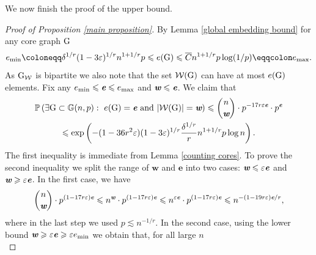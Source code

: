 \documentclass[a4paper,11pt,english,reqno]{amsart}
\numberwithin{equation}{section}
\renewcommand{\leq}{\leqslant}
\renewcommand{\geq}{\geqslant}
\newcommand{\cbar}{\overline{C}}
\newcommand{\W}{\mathcal{W}}
\renewcommand{\P}{\mathbb{P}}
\newcommand{\G}{\mathbb{G}}
\newcommand{\tu}[1]{\textup{#1}}
\def\mathbi#1{\textbf{\em #1}}
\begin{document}
		
		
		
		
		We now finish the proof of the upper bound.
		\begin{proof}[Proof of Proposition \ref{main proposition}]
			By Lemma \ref{global embedding bound} for any core graph $\tu{G}$ %
			\begin{equation*}
				e_{\min} \coloneqq \delta^{1/r}(1-3\varepsilon)^{1/r}n^{1+1/r}p \leq e(\tu{G})\leq \cbar n^{1+1/r}p\log(1/p) \eqqcolon e_{\max}.
			\end{equation*}
			As $\tu{G}_{\mathcal{W}}$ is bipartite we also note that the set $\W(\tu{G})$ can have at most $e(\tu{G})$ elements.
			Fix any $e_{\min}\leq \mathbi{e} \leq e_{\max}$ and $\mathbi{w}\leq \mathbi{e}$. We claim that %
			\begin{multline}
				\label{main proof eq 1}
				\P\left(\exists \tu{G}\subset \G(n,p):\ e(\tu{G})=\mathbi{e}\text{ and } |\W(\tu{G})|=\mathbi{w}\right)\leq {n\choose \mathbi{w}}\cdot p^{-17r\varepsilon \mathbi{e}}\cdot p^{\mathbi{e}} \\
				\leq \exp\left(-(1-36r^{2}\varepsilon)(1-3\varepsilon)^{1/r}\frac{\delta^{1/r}}{r}n^{1+1/r}p\log n\right).
			\end{multline}
			The first inequality is immediate from Lemma \ref{counting cores}. To prove the second inequality we split the range of  ${\bm w}$ and ${\bm e}$ into two cases: $\mathbi{w}\leq \varepsilon \mathbi{e}$ and $\mathbi{w}\geq \varepsilon \mathbi{e} $. In the first case, we have
			\begin{equation}
				\label{main proof eq 2}
				{n\choose \mathbi{w}}\cdot p^{(1-17r\varepsilon)\mathbi{e}}\leq n^{\mathbi{w}}\cdot p^{(1-17r\varepsilon)\mathbi{e}}\leq n^{\varepsilon \mathbi{e}}\cdot p^{(1-17r\varepsilon)\mathbi{e}} \leq n^{-(1-19r\varepsilon)\mathbi{e}/r},
			\end{equation}
			where in the last step we used $p\lesssim  n^{-1/r}$.
			In the second case, using the lower bound $\mathbi{w}\geq \varepsilon \mathbi{e}\geq \varepsilon e_{\min}$ we obtain that, for all large $n$
			\begin{equation*}

\end{equation*}
\end{proof}
\end{document}
